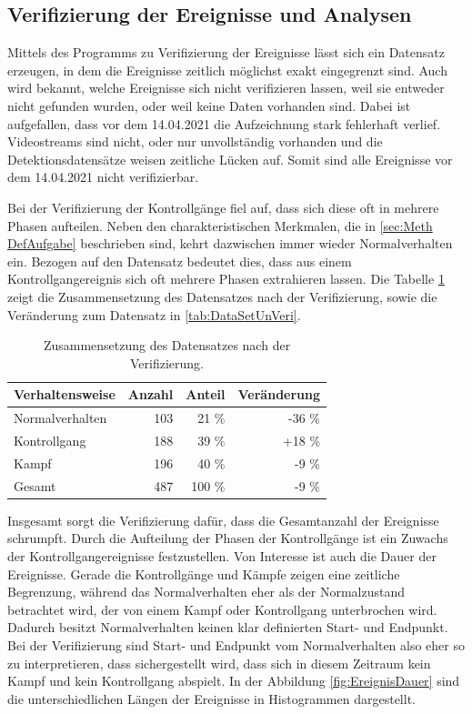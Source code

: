 \subsection{Verifizierung der Ereignisse und Analysen}
Mittels des Programms zu Verifizierung der Ereignisse lässt sich ein Datensatz erzeugen, in dem die Ereignisse zeitlich möglichst exakt eingegrenzt sind. Auch wird bekannt, welche Ereignisse sich nicht verifizieren lassen, weil sie entweder nicht gefunden wurden, oder weil keine Daten vorhanden sind. Dabei ist aufgefallen, dass vor dem 14.04.2021 die Aufzeichnung stark fehlerhaft verlief. Videostreams sind nicht, oder nur unvollständig vorhanden und die Detektionsdatensätze weisen zeitliche Lücken auf. Somit sind alle Ereignisse vor dem 14.04.2021 nicht verifizierbar. \par

Bei der Verifizierung der Kontrollgänge fiel auf, dass sich diese oft in mehrere Phasen aufteilen. Neben den charakteristischen Merkmalen, die in \autoref{sec:Meth DefAufgabe} beschrieben sind, kehrt dazwischen immer wieder Normalverhalten ein. Bezogen auf den Datensatz bedeutet dies, dass aus einem Kontrollgangereignis sich oft mehrere Phasen extrahieren lassen. Die Tabelle \ref{tab:DataSetVeri} zeigt die Zusammensetzung des Datensatzes nach der Verifizierung, sowie die Veränderung zum Datensatz in \autoref{tab:DataSetUnVeri}. 

\begin{table}[ht]
    \centering
    \caption{Zusammensetzung des Datensatzes nach der Verifizierung.}
    \begin{tabular}{|l|r|r|r|}
    \hline
        Verhaltensweise & Anzahl & Anteil & Veränderung\\
    \hline
        Normalverhalten & 103 & 21 \% & -36 \%\\
        Kontrollgang & 188 & 39 \% & +18 \%\\
        Kampf & 196 & 40 \% & -9 \%\\
    \hline
    \hline
        Gesamt & 487 & 100 \% & -9 \% \\
    \hline
    \end{tabular}
    \label{tab:DataSetVeri}
\end{table}

Insgesamt sorgt die Verifizierung dafür, dass die Gesamtanzahl der Ereignisse schrumpft. Durch die Aufteilung der Phasen der Kontrollgänge ist ein Zuwachs der Kontrollgangereignisse festzustellen. Von Interesse ist auch die Dauer der Ereignisse. Gerade die Kontrollgänge und Kämpfe zeigen eine zeitliche Begrenzung, während das Normalverhalten eher als der Normalzustand betrachtet wird, der von einem Kampf oder Kontrollgang unterbrochen wird. Dadurch besitzt Normalverhalten keinen klar definierten Start- und Endpunkt. Bei der Verifizierung sind Start- und Endpunkt vom Normalverhalten also eher so zu interpretieren, dass sichergestellt wird, dass sich in diesem Zeitraum kein Kampf und kein Kontrollgang abspielt. In der Abbildung \ref{fig:EreignisDauer} sind die unterschiedlichen Längen der Ereignisse in Histogrammen dargestellt.

